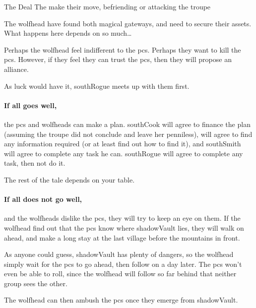 \southSeeker[\setcounter{spentMP}{4}]


{The Deal}%
{The  make their move, befriending or attacking the troupe}%

The \gls{wolfhead} have found both magical gateways, and need to secure their assets.
What happens here depends on so much\ldots

Perhaps the \gls{wolfhead} feel indifferent to the \glspl{pc}.
Perhaps they want to kill the \glspl{pc}.
However, if they feel they can trust the \glspl{pc}, then they will propose an alliance.

As luck would have it, \gls{southRogue} meets up with them first.

\paragraph{If all goes well,}
the \glspl{pc} and \glspl{wolfhead} can make a plan.
\Gls{southCook} will agree to finance the plan (assuming the troupe did not conclude  and leave her penniless),  will agree to find any information required (or at least find out how to find it), and \gls{southSmith} will agree to complete any task he can.
\Gls{southRogue} will agree to complete any task, then not do it.

The rest of the tale depends on your table.

\paragraph{If all does not go well,}
and the \glspl{wolfhead} dislike the \glspl{pc}, they will try to keep an eye on them.
If the \gls{wolfhead} find out that the \glspl{pc} know where \gls{shadowVault} lies, they will walk on ahead, and make a long stay at the last \gls{village} before the mountains in front.

As anyone could guess, \gls{shadowVault} has plenty of dangers, so the \gls{wolfhead} simply wait for the \glspl{pc} to go ahead, then follow on a day later.
The \glspl{pc} won't even be able to roll, since the \gls{wolfhead} will follow so far behind that neither group sees the other.

The \gls{wolfhead} can then \gls{ambush} the \glspl{pc} once they emerge from \gls{shadowVault}.

